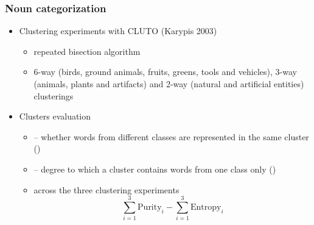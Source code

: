 \begin{frame}
\frametitle{Noun categorization}
\begin{itemize}
\item Clustering experiments with CLUTO (Karypis 2003)
\begin{itemize}
\item repeated bisection algorithm
\item 6-way (birds, ground animals, fruits, greens,
tools and vehicles), 3-way (animals, plants and
artifacts) and 2-way (natural and artificial entities) clusterings
\end{itemize}
\pause
\item Clusters evaluation
\begin{itemize}
\item {} -- whether words from different classes are represented in the same cluster ()
\item {} -- degree to which a cluster contains words from one class only ()
\item {} across the three clustering experiments
\begin{displaymath}
\sum_{i=1}^3 \text{Purity}_i -  \sum_{i=1}^3 \text{Entropy}_i
\end{displaymath}

\end{itemize}
\end{itemize}
\end{frame}


